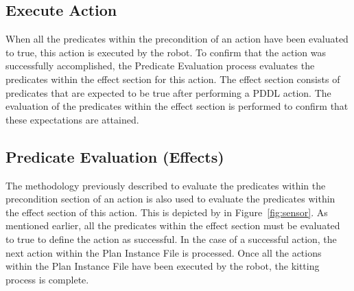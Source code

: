 \subsection{Execute Action}
When all the predicates within the precondition of an action have been evaluated to true, this action is executed by the robot. To confirm that the action was successfully accomplished, the \textsf{Predicate Evaluation} process evaluates the predicates within the effect section for this action. The effect section consists of predicates that are expected to be true after performing a PDDL action. The evaluation of the predicates within the effect section is performed to confirm that these expectations are attained.

\subsection{Predicate Evaluation (Effects)}
The methodology previously described to evaluate the predicates within the precondition section of an action is also used to evaluate the predicates within the effect section of this action. This is depicted by  in Figure~\ref{fig:sensor}. As mentioned earlier, all the predicates within the effect section must be evaluated to true to define the action as successful. In the case of a successful action, the next action within the \textsf{Plan Instance File} is processed. Once all the actions within the \textsf{Plan Instance File} have been executed by the robot, the kitting process is complete.
% 
% 
